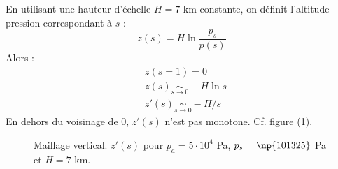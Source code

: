 \documentclass[a4paper,french]{article}
\begin{document}
En utilisant une hauteur d'échelle $H = 7$ km constante, on définit
l'altitude-pression correspondant à $s$ :
\begin{displaymath}
  z(s) = H \ln \frac{p_s}{p(s)}
\end{displaymath}
Alors :
\begin{align*}
  & z(s=1) = 0 \\
  & z(s) \underset{s \to 0}{\sim} - H \ln s \\
  & z'(s) \underset{s \to 0}{\sim} - H / s
\end{align*}
En dehors du voisinage de 0, $z'(s)$ n'est pas monotone. Cf. figure
(\ref{fig:dz_ds}).
\begin{figure}[htbp]
  \centering
  
  \caption[Maillage vertical : $z'(s)$]{Maillage vertical. $z'(s)$ pour
    $p_a = 5 \cdot 10^4$ Pa, $p_s = \np{101325}$ Pa et $H = 7$
    km.}
  \label{fig:dz_ds}
\end{figure}
\end{document}
